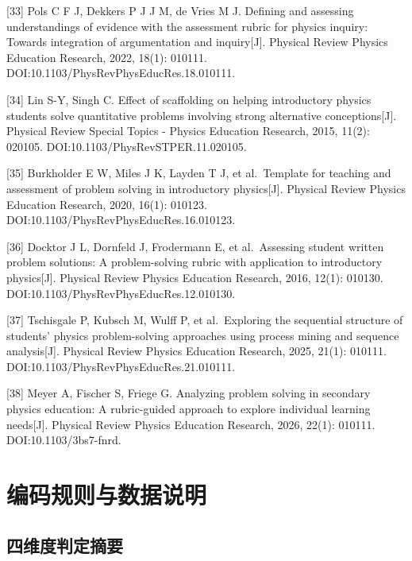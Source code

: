 \documentclass[
  12pt,
  a4paper,twoside,openany]{ctexbook}
\begin{document}
{[}33{]} Pols C F J, Dekkers P J J M, de Vries M J. Defining and
assessing understandings of evidence with the assessment rubric for
physics inquiry: Towards integration of argumentation and
inquiry{[}J{]}. Physical Review Physics Education Research, 2022, 18(1):
010111. DOI:10.1103/PhysRevPhysEducRes.18.010111.

{[}34{]} Lin S-Y, Singh C. Effect of scaffolding on helping introductory
physics students solve quantitative problems involving strong
alternative conceptions{[}J{]}. Physical Review Special Topics - Physics
Education Research, 2015, 11(2): 020105.
DOI:10.1103/PhysRevSTPER.11.020105.

{[}35{]} Burkholder E W, Miles J K, Layden T J, et al.~Template for
teaching and assessment of problem solving in introductory
physics{[}J{]}. Physical Review Physics Education Research, 2020, 16(1):
010123. DOI:10.1103/PhysRevPhysEducRes.16.010123.

{[}36{]} Docktor J L, Dornfeld J, Frodermann E, et al.~Assessing student
written problem solutions: A problem-solving rubric with application to
introductory physics{[}J{]}. Physical Review Physics Education Research,
2016, 12(1): 010130. DOI:10.1103/PhysRevPhysEducRes.12.010130.

{[}37{]} Tschisgale P, Kubsch M, Wulff P, et al.~Exploring the
sequential structure of students' physics problem-solving approaches
using process mining and sequence analysis{[}J{]}. Physical Review
Physics Education Research, 2025, 21(1): 010111.
DOI:10.1103/PhysRevPhysEducRes.21.010111.

{[}38{]} Meyer A, Fischer S, Friege G. Analyzing problem solving in
secondary physics education: A rubric-guided approach to explore
individual learning needs{[}J{]}. Physical Review Physics Education
Research, 2026, 22(1): 010111. DOI:10.1103/3bs7-fnrd.
\endgroup

\appendix

\chapter{编码规则与数据说明}\label{ux7f16ux7801ux89c4ux5219ux4e0eux6570ux636eux8bf4ux660e}

\section{四维度判定摘要}\label{ux56dbux7ef4ux5ea6ux5224ux5b9aux6458ux8981}
\end{document}
